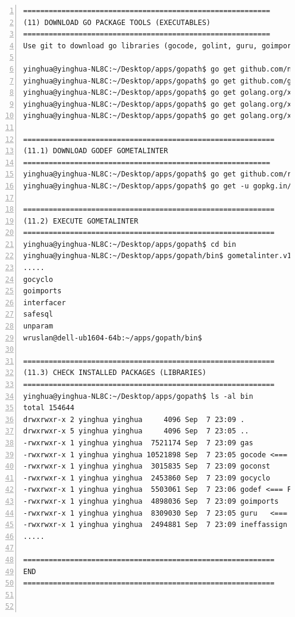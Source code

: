 \begin{lstlisting}[breaklines, frame=single, numbers=left, caption={Linux command for Golang compiler installation}, label=commandline-02]
==========================================================
(11) DOWNLOAD GO PACKAGE TOOLS (EXECUTABLES)
==========================================================
Use git to download go libraries (gocode, golint, guru, goimports, gorename, godef)  

yinghua@yinghua-NL8C:~/Desktop/apps/gopath$ go get github.com/nsf/gocode
yinghua@yinghua-NL8C:~/Desktop/apps/gopath$ go get github.com/golang/lint/golint
yinghua@yinghua-NL8C:~/Desktop/apps/gopath$ go get golang.org/x/tools/cmd/guru
yinghua@yinghua-NL8C:~/Desktop/apps/gopath$ go get golang.org/x/tools/cmd/goimports
yinghua@yinghua-NL8C:~/Desktop/apps/gopath$ go get golang.org/x/tools/cmd/gorename

===========================================================
(11.1) DOWNLOAD GODEF GOMETALINTER
==========================================================
yinghua@yinghua-NL8C:~/Desktop/apps/gopath$ go get github.com/rogpeppe/godef
yinghua@yinghua-NL8C:~/Desktop/apps/gopath$ go get -u gopkg.in/alecthomas/gometalinter.v1

===========================================================
(11.2) EXECUTE GOMETALINTER
===========================================================
yinghua@yinghua-NL8C:~/Desktop/apps/gopath$ cd bin
yinghua@yinghua-NL8C:~/Desktop/apps/gopath/bin$ gometalinter.v1 --install
.....
gocyclo
goimports
interfacer
safesql
unparam
wruslan@dell-ub1604-64b:~/apps/gopath/bin$ 

===========================================================
(11.3) CHECK INSTALLED PACKAGES (LIBRARIES)
===========================================================
yinghua@yinghua-NL8C:~/Desktop/apps/gopath$ ls -al bin
total 154644
drwxrwxr-x 2 yinghua yinghua     4096 Sep  7 23:09 .
drwxrwxr-x 5 yinghua yinghua     4096 Sep  7 23:05 ..
-rwxrwxr-x 1 yinghua yinghua  7521174 Sep  7 23:09 gas
-rwxrwxr-x 1 yinghua yinghua 10521898 Sep  7 23:05 gocode <=== FOR ECLIPSE IDE
-rwxrwxr-x 1 yinghua yinghua  3015835 Sep  7 23:09 goconst
-rwxrwxr-x 1 yinghua yinghua  2453860 Sep  7 23:09 gocyclo
-rwxrwxr-x 1 yinghua yinghua  5503061 Sep  7 23:06 godef <=== FOR ECLIPSE IDE
-rwxrwxr-x 1 yinghua yinghua  4898036 Sep  7 23:09 goimports
-rwxrwxr-x 1 yinghua yinghua  8309030 Sep  7 23:05 guru   <=== FOR ECLIPSE IDE
-rwxrwxr-x 1 yinghua yinghua  2494881 Sep  7 23:09 ineffassign
.....

===========================================================
END
===========================================================



\end{lstlisting}    

